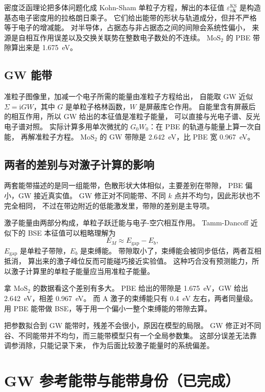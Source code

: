 \documentclass[11pt,a4paper]{ctexart}
\newcommand{\done}{（已完成）}
\newcommand{\kk}{\mathbf{k}}
\newcommand{\eps}{\varepsilon}
\newcommand{\ii}{\mathrm{i}}
\begin{document}
密度泛函理论把多体问题化成 Kohn-Sham 单粒子方程，解出的本征值 $\eps^{\mathrm{KS}}_{n\kk}$
是构造基态电子密度用的拉格朗日乘子。
它们给出能带的形状与轨道成分，但并不严格等于电子的增减能。
对半导体，占据态与非占据态之间的间隙会系统性偏小，
来源是自相互作用误差以及交换关联势在整数电子数处的不连续。
$\mathrm{MoS_2}$ 的 PBE 带隙算出来是 1.675~eV。

\subsection{GW 能带}

准粒子图像里，加减一个电子所需的能量由准粒子方程给出，
自能取 GW 近似 $\Sigma=\ii GW$，其中 $G$ 是单粒子格林函数，$W$ 是屏蔽库仑作用。
自能里含有屏蔽后的相互作用，所以 GW 给出的本征值是准粒子能量，
可以直接与光电子谱、反光电子谱对照。
实际计算多用单次微扰的 $G_0W_0$：在 PBE 的轨道与能量上算一次自能，
再解准粒子方程。
$\mathrm{MoS_2}$ 的 GW 带隙是 2.642~eV，比 PBE 宽 0.967~eV。

\subsection{两者的差别与对激子计算的影响}

两套能带描述的是同一组能带，色散形状大体相似，主要差别在带隙，
PBE 偏小，GW 接近真实值。
GW 修正对不同能带、不同 $k$ 点并不均匀，因此形状也不完全相同，
不过在带边附近的低能激发里，带隙的差别是主导项。

激子能量由两部分构成，单粒子跃迁能与电子-空穴相互作用。
Tamm-Dancoff 近似下的 BSE 本征值可以粗略理解为
\begin{equation}
E_M\approx E_{\mathrm{gap}}-E_b ,
\end{equation}
$E_{\mathrm{gap}}$ 是单粒子带隙，$E_b$ 是束缚能。
带隙取小了，束缚能会被同步低估，两者互相抵消，
算出来的激子峰位反而可能碰巧接近实验值。
这种巧合没有预测能力，所以激子计算里的单粒子能量应当用准粒子能量。

拿 $\mathrm{MoS_2}$ 的数据看这个差别有多大。
PBE 给出的带隙是 1.675~eV，GW 给出 2.642~eV，相差 0.967~eV。
而 A 激子的束缚能只有 0.4~eV 左右，两者同量级。
用 PBE 能带做 BSE，等于用一个偏小一整个束缚能的带隙去算。

把参数拟合到 GW 能带时，残差不会很小，原因在模型的局限。
GW 修正对不同谷、不同能带并不均匀，而三能带模型只有一个全局参数集。
这部分误差无法靠调参消除，只能记录下来，
作为后面比较激子能量时的系统偏差。

\newpage
\section{GW 参考能带与能带身份\done}
\end{document}
